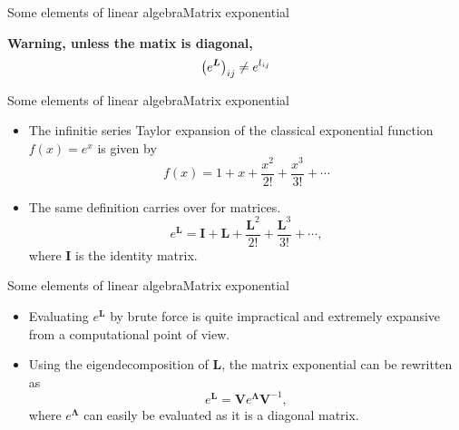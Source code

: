 \documentclass[usenames,dvipsnames,svgnames,10pt,aspectratio=169]{beamer}
\begin{document}
\begin{frame}[t, c]{Some elements of linear algebra}{Matrix exponential}

	\begin{block}{\centering \textbf{Warning, unless the matix is diagonal,}}
		\begin{equation}
			\left( e^{\bm L} \right)_{ij} \neq e^{l_{ij}}
			\notag
		\end{equation}
	\end{block}

	\vspace{1cm}
\end{frame}

\begin{frame}[t, c]{Some elements of linear algebra}{Matrix exponential}
	\begin{itemize}
		\item The infinitie series Taylor expansion of the classical exponential function $f(x) = e^x$ is given by
		$$f(x) = 1 + x + \displaystyle \frac{x^2}{2!} + \frac{x^3}{3!} + \cdots$$

		\bigskip

		\item The same definition carries over for matrices.
		$$e^{\bm L} = {\bm I} + {\bm L} + \displaystyle  \frac{{\bm L}^2}{2!} + \frac{{\bm L}^3}{3!} + \cdots,$$
		where ${\bm I}$ is the identity matrix.
	\end{itemize}

	\vspace{1cm}
\end{frame}

\begin{frame}[t, c]{Some elements of linear algebra}{Matrix exponential}
	\begin{itemize}
		\item Evaluating $e^{\bm L}$ by brute force is quite impractical and extremely expansive from a computational point of view.

		\bigskip

		\item Using the eigendecomposition of ${\bm L}$, the matrix exponential can be rewritten as
		$$e^{\bm L} = {\bm V} e^{\boldsymbol \Lambda} {\bm V}^{-1},$$
		where $e^{\boldsymbol \Lambda}$ can easily be evaluated as it is a diagonal matrix.
	\end{itemize}

	\vspace{1cm}
\end{frame}
\end{document}
